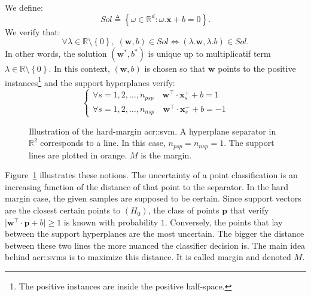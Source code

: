                We define:
                \begin{equation*}
                    Sol \triangleq \left\{\omega \in \mathbb{R}^d : \omega.\bm{x} + b = 0\right\}.
                \end{equation*}
                We verify that:
                \begin{equation*}
                    \forall \lambda \in \mathbb{R}\setminus\left\{0\right\}, \; (\bm{w}, b) \in  Sol \Leftrightarrow (\lambda . \bm{w}, \lambda.b) \in Sol.
                \end{equation*}
                In other words, the solution $(\bm{w}^*, b^*)$ is unique up to multiplicatif term $\lambda \in \mathbb{R}\setminus\left\{0\right\}$.
                In this context, $(\bm{w}, b)$ is chosen so that \(\bm{w}\) points to the positive instances\footnote{The positive instances are inside the positive half-space.} and the support hyperplanes verify:
                \begin{equation}
                    \label{eq::support_lines}
                    \begin{cases}
                        \forall s=1,2,\dots,n_{psp} \quad \bm{w}^\intercal\cdot\bm{x}^+_s + b = 1\\              
                        \forall s=1,2,\dots,n_{nsp} \quad \bm{w}^\intercal\cdot\bm{x}^-_s + b = -1                
                    \end{cases}
                \end{equation}

                \begin{figure}
                    \centering
                    
                    \caption[
                        Illustration of the hard-margin \acrshort*{acr::svm}.
                    ]{
                        \label{fig::linear_separable} 
                        Illustration of the hard-margin \gls{acr::svm}.
                        A hyperplane separator in $\mathbb{R}^2$ corresponds to a line.
                        In this case, $n_{psp} = n_{nsp} = 1$.
                        The support lines are plotted in orange.
                        $M$ is the margin.
                    }
                \end{figure}

                Figure~\ref{fig::linear_separable} illustrates these notions.
                The uncertainty of a point classification is an increasing function of the distance of that point to the separator.
                In the hard margin case, the given samples are supposed to be certain.
                Since support vectors are the closest certain points to $(H_0)$, the class of points $\bm{p}$ that verify $\vert\bm{w}^\intercal\cdot\bm{p} + b\vert \geq 1$ is known with probability $1$.
                Conversely, the points that lay between the support hyperplanes are the most uncertain.
                The bigger the distance between these two lines the more nuanced the classifier decision is.
                The main idea behind \glspl{acr::svm} is to maximize this distance.
                It is called margin and denoted $M$.\\


